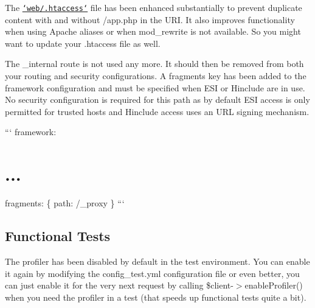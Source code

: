 
\begin{DoxyItemize}
\item The \href{https://github.com/symfony/symfony-standard/blob/2.2/web/.htaccess}{\tt `web/.htaccess`} file has been enhanced substantially to prevent duplicate content with and without {\ttfamily /app.php} in the U\+R\+I. It also improves functionality when using Apache aliases or when mod\+\_\+rewrite is not available. So you might want to update your {\ttfamily .htaccess} file as well.
\item The {\ttfamily \+\_\+internal} route is not used any more. It should then be removed from both your routing and security configurations. A {\ttfamily fragments} key has been added to the framework configuration and must be specified when E\+S\+I or Hinclude are in use. No security configuration is required for this path as by default E\+S\+I access is only permitted for trusted hosts and Hinclude access uses an U\+R\+L signing mechanism.

``` framework\+: \section*{...}

fragments\+: \{ path\+: /\+\_\+proxy \} ```
\end{DoxyItemize}

\subsection*{Functional Tests }


\begin{DoxyItemize}
\item The profiler has been disabled by default in the test environment. You can enable it again by modifying the {\ttfamily config\+\_\+test.\+yml} configuration file or even better, you can just enable it for the very next request by calling {\ttfamily \$client-\/$>$enable\+Profiler()} when you need the profiler in a test (that speeds up functional tests quite a bit). 
\end{DoxyItemize}